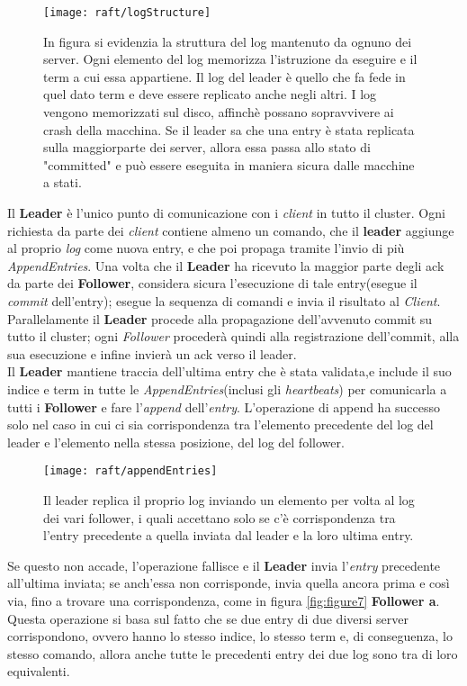 \begin{figure}[H]
	\centering
	\texttt{[image: raft/logStructure]}
	\caption{In figura si evidenzia la struttura del log mantenuto da ognuno dei server. Ogni elemento del log memorizza l'istruzione da eseguire e il term a cui essa appartiene.
		Il log del leader è quello che fa fede in quel dato term e deve essere replicato anche negli altri.
		I log vengono memorizzati sul disco, affinchè possano sopravvivere ai crash della macchina. 
		Se il leader sa che una entry è stata replicata sulla maggiorparte dei server, allora essa passa allo stato di "committed" e può essere eseguita in maniera sicura dalle macchine a stati.}
	\label{fig:figure5}
\end{figure}
Il \textbf{Leader} è l'unico punto di comunicazione con i \textit{client} in tutto il cluster. Ogni richiesta da parte dei \textit{client} contiene almeno un comando, che il \textbf{leader} aggiunge al proprio \textit{log} come nuova entry, e che poi propaga tramite l'invio di più \textit{AppendEntries}.
Una volta che il \textbf{Leader} ha ricevuto la maggior parte degli ack da parte dei \textbf{Follower}, considera sicura l'esecuzione di tale entry(esegue il \textit{commit} dell'entry); esegue la sequenza di comandi e invia il risultato al \textit{Client}.
Parallelamente il \textbf{Leader} procede alla propagazione dell'avvenuto commit su tutto il cluster; ogni \textit{Follower} procederà quindi alla registrazione dell'commit, alla sua esecuzione e infine invierà un ack verso il leader.
\\
Il \textbf{Leader} mantiene traccia dell'ultima entry che è stata validata,e include il suo indice e term in tutte le \textit{AppendEntries}(inclusi gli \textit{heartbeats}) per comunicarla a tutti i \textbf{Follower} e fare l'\textit{append} dell'\textit{entry}.
L'operazione di append ha successo solo nel caso in cui ci sia corrispondenza tra l'elemento precedente del log del leader e l'elemento nella stessa posizione, del log del follower. 
\begin{figure}[H]
	\centering
	\texttt{[image: raft/appendEntries]}
	\caption{Il leader replica il proprio log inviando un elemento per volta al log dei vari follower, i quali accettano solo se c'è corrispondenza tra l'entry precedente a quella inviata dal leader e la loro ultima entry.}
	\label{fig:figure6}
\end{figure}

Se questo non accade, l'operazione fallisce e il \textbf{Leader} invia l'\textit{entry} precedente all'ultima inviata; se anch'essa non corrisponde, invia quella ancora prima e così via, fino a trovare una corrispondenza, come in figura \ref{fig:figure7} \textbf{Follower a}.
Questa operazione si basa sul fatto che se due entry di due diversi server corrispondono, ovvero hanno lo stesso indice, lo stesso term e, di conseguenza, lo stesso comando, allora anche tutte le precedenti entry dei due log sono tra di loro equivalenti.

